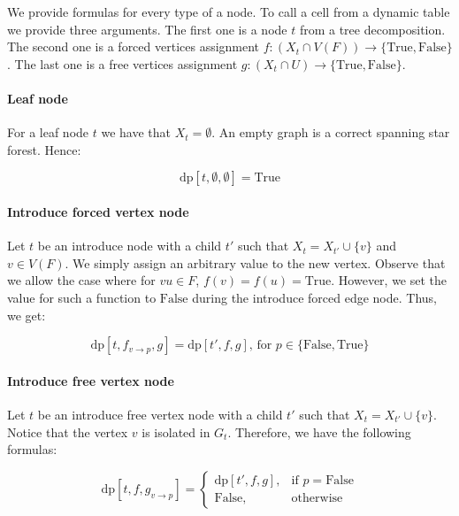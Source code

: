 \documentclass[en]{pracamgr}
\theoremstyle{definition}
\newcommand{\dpt}[1]{\textrm{dp}[#1]}
\newcommand{\true}{\textrm{True}}
\newcommand{\false}{\textrm{False}}
\begin{document}
We provide formulas for every type of a node. To call a cell from a dynamic table we provide three arguments. The first one is a node $t$ from a tree decomposition. The second one is a forced vertices assignment $f:(X_t \cap V(F)) \rightarrow \{\true, \false\}$. The last one is  a free vertices assignment $g:(X_t \cap U) \rightarrow \{\true, \false\}$.

\paragraph{Leaf node} For a leaf node $t$ we have that $X_t=\emptyset$. An empty graph is a correct spanning star forest. Hence:

\begin{equation*}
	\dpt{t,\emptyset,\emptyset}=\true
\end{equation*}

\paragraph{Introduce forced vertex node} Let $t$ be an introduce node with a child $t'$ such that $X_t = X_{t'} \cup \{v\}$ and $v \in V(F)$. We simply assign an arbitrary value to the new vertex. Observe that we allow the case where for $vu \in F$, $f(v)=f(u)=\true$. However, we set the value for such a function to $\false$ during the introduce forced edge node. Thus, we get:

\begin{equation*}
	\dpt{t,f_{v \rightarrow p},g}= \dpt{t',f,g}\text{, for $p \in \{\false,\true\}$}
\end{equation*}

\paragraph{Introduce free vertex node} Let $t$ be an introduce free vertex node with a child $t'$ such that $X_t = X_{t'} \cup \{v\}$. Notice that the vertex $v$ is isolated in $G_t$. Therefore, we have the following formulas:

\begin{equation*}
	\dpt{t,f,g_{v \rightarrow p}} =
	\begin{cases}
		\dpt{t',f,g}, & \text{if $p=\false$} \\
		\false, &\text{otherwise}
	\end{cases}
\end{equation*}
\end{document}
